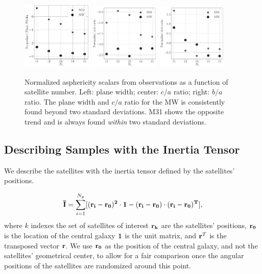 \documentclass[a4paper,fleqn,usenatbib]{mnras}
\begin{document}
\begin{figure}
\centering
\includegraphics[width=0.30\textwidth]{normalized_width_n_dependence.pdf}
\includegraphics[width=0.30\textwidth]{normalized_ca_ratio_n_dependence.pdf}
\includegraphics[width=0.30\textwidth]{normalized_ba_ratio_n_dependence.pdf}
\caption{Normalized asphericity scalars from observations as a function
  of satellite number. Left: plane width; center: $c/a$ ratio;
  right: $b/a$ ratio. 
  The plane width and $c/a$ ratio for the MW is
  consistently found beyond two standard
  deviations.
  M31 shows the opposite trend and is always found
  \emph{within} two standard deviations. \label{fig:normalized_n}} 
\end{figure}



\subsection{Describing Samples with the Inertia Tensor}

We describe the satellites with the inertia
tensor defined by the satellites' positions.  

\begin{equation}
{\bf{\bar{I}}} = \sum_{i=1}^{N_p}[(\bf{r}_i - \bf{r}_0)^2\cdot \bf{1} -
  (\bf{r}_i-\bf{r}_0)\cdot (\bf{r}_i - \bf{r}_0)^{T}],
\label{eq:intensor}
\end{equation}
%
where $k$ indexes the set of satellites of interest
$\bf{r}_k$ are the satellites' positions, $\bf{r}_{0}$ is the location
of the central galaxy $\bf{1}$ is the unit matrix, and  
${\bf r}^T$ is the transposed vector $\bf{r}$. 
We use $\bf{r}_0$ as the position of the central galaxy, and not the
satellites' geometrical center, to allow for a fair comparison once
the angular positions of the satellites are randomized around this
point. 
\end{document}

